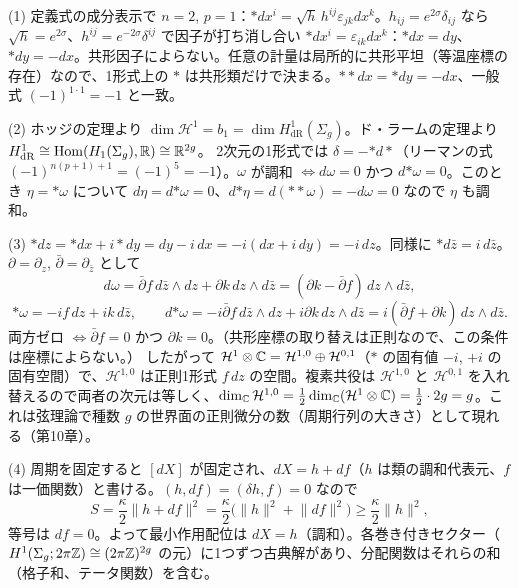 \begin{solution}
(1) 定義式の成分表示で $n=2$, $p=1$：${*}dx^i=\sqrt{h}\,h^{ij}\varepsilon_{jk}dx^k$。$h_{ij}=e^{2\sigma}\delta_{ij}$ なら $\sqrt h=e^{2\sigma}$、$h^{ij}=e^{-2\sigma}\delta^{ij}$ で因子が打ち消し合い ${*}dx^i=\varepsilon_{ik}dx^k$：${*}dx=dy$、${*}dy=-dx$。共形因子によらない。任意の計量は局所的に共形平坦（等温座標の存在）なので、1形式上の ${*}$ は共形類だけで決まる。${**}dx={*}dy=-dx$、一般式 $(-1)^{1\cdot1}=-1$ と一致。

(2) ホッジの定理より $\dim\mathcal H^1=b_1=\dim H^1_{\mathrm{dR}}(\Sigma_g)$。ド・ラームの定理より $H^1_{\mathrm{dR}}\cong\operatorname{Hom}(H_1(\Sigma_g),\mathbb{R})\cong\mathbb{R}^{2g}$。
2次元の1形式では $\delta=-{*d*}$（リーマンの式 $(-1)^{n(p+1)+1}=(-1)^{5}=-1$）。$\omega$ が調和 $\iff d\omega=0$ かつ $d{*\omega}=0$。このとき $\eta={*\omega}$ について $d\eta=d{*\omega}=0$、$d{*\eta}=d({**\omega})=-d\omega=0$ なので $\eta$ も調和。

(3) ${*}dz={*}dx+i{*}dy=dy-i\,dx=-i(dx+i\,dy)=-i\,dz$。同様に ${*}d\bar z=i\,d\bar z$。$\partial=\partial_z$, $\bar\partial=\partial_{\bar z}$ として
\[
d\omega=\bar\partial f\,d\bar z\wedge dz+\partial k\,dz\wedge d\bar z=(\partial k-\bar\partial f)\,dz\wedge d\bar z ,
\]
\[
{*\omega}=-i f\,dz+i k\,d\bar z,\qquad d{*\omega}=-i\bar\partial f\,d\bar z\wedge dz+i\partial k\,dz\wedge d\bar z=i(\bar\partial f+\partial k)\,dz\wedge d\bar z .
\]
両方ゼロ $\iff\bar\partial f=0$ かつ $\partial k=0$。（共形座標の取り替えは正則なので、この条件は座標によらない。）
したがって $\mathcal H^1\otimes\mathbb{C}=\mathcal H^{1,0}\oplus\mathcal H^{0,1}$（${*}$ の固有値 $-i$, $+i$ の固有空間）で、$\mathcal H^{1,0}$ は正則1形式 $f\,dz$ の空間。複素共役は $\mathcal H^{1,0}$ と $\mathcal H^{0,1}$ を入れ替えるので両者の次元は等しく、$\dim_{\mathbb{C}}\mathcal H^{1,0}=\frac12\dim_{\mathbb{C}}(\mathcal H^1\otimes\mathbb{C})=\frac12\cdot2g=g$。これは弦理論で種数 $g$ の世界面の正則微分の数（周期行列の大きさ）として現れる（第10章）。

(4) 周期を固定すると $[dX]$ が固定され、$dX=h+df$（$h$ は類の調和代表元、$f$ は一価関数）と書ける。$(h,df)=(\delta h,f)=0$ なので
\[
S=\frac\kappa2\lVert h+df\rVert^2=\frac\kappa2\bigl(\lVert h\rVert^2+\lVert df\rVert^2\bigr)\ge\frac\kappa2\lVert h\rVert^2 ,
\]
等号は $df=0$。よって最小作用配位は $dX=h$（調和）。各巻き付きセクター（$H^1(\Sigma_g;2\pi\mathbb{Z})\cong(2\pi\mathbb{Z})^{2g}$ の元）に1つずつ古典解があり、分配関数はそれらの和（格子和、テータ関数）を含む。
\end{solution}

